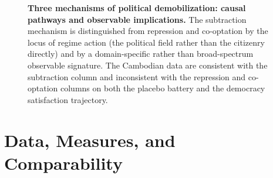 \documentclass[Review,times,sageh,doublespace]{sagej}
\begin{document}
\begin{figure}[!htbp]
{%
}%
\caption{\textbf{Three mechanisms of political demobilization: causal pathways and observable implications.}
The subtraction mechanism is distinguished from repression and co-optation by the locus of regime action
(the political field rather than the citizenry directly) and by a domain-specific rather than broad-spectrum
observable signature. The Cambodian data are consistent with the subtraction column and inconsistent with the
repression and co-optation columns on both the placebo battery and the democracy satisfaction trajectory.}
\label{fig:mechanisms}
\end{figure}

\section{Data, Measures, and
Comparability}\label{data-measures-and-comparability}
\end{document}

